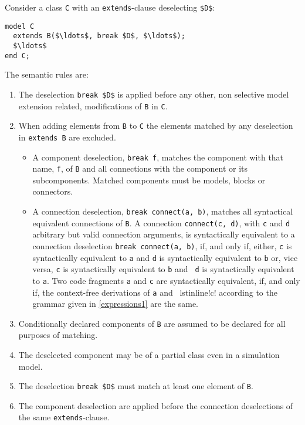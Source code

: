 Consider a class \lstinline!C! with an \lstinline!extends!-clause deselecting \lstinline!$D$!:
\begin{lstlisting}[language=modelica]
model C
  extends B($\ldots$, break $D$, $\ldots$);
  $\ldots$
end C;
\end{lstlisting}
The semantic rules are:
\begin{enumerate}
\item
  The deselection \lstinline!break $D$! is applied before any other, non selective model extension related, modifications of \lstinline!B! in \lstinline!C!.
\item
  When adding elements from \lstinline!B! to \lstinline!C! the elements matched by any deselection in \lstinline!extends B! are excluded.
  \begin{itemize}
  \item
    A component deselection, \lstinline!break f!, matches the component with that name, \lstinline!f!, of \lstinline!B! and all connections with the  component or its subcomponents.
    Matched components must be models, blocks or connectors.
  \item
    A connection deselection, \lstinline!break connect(a, b)!, matches all syntactical equivalent connections of \lstinline!B!.
    A connection \lstinline!connect(c, d)!, with \lstinline!c! and \lstinline!d! arbitrary but valid connection arguments, is syntactically equivalent  to a connection deselection \lstinline!break connect(a, b)!, if, and only if, either, \lstinline!c! is syntactically equivalent to \lstinline!a! and   \lstinline!d! is syntactically equivalent to \lstinline!b! or, vice versa, \lstinline!c! is syntactically equivalent to \lstinline!b! and \lstinline! d! is syntactically equivalent to \lstinline!a!.
    Two code fragments \lstinline!a! and \lstinline!c! are syntactically equivalent, if, and only if, the context-free derivations of \lstinline!a! and \ lstinline!c! according to the grammar given in \cref{expressions1} are the same.
  \end{itemize}
\item
  Conditionally declared components of \lstinline!B! are assumed to be declared for all purposes of matching.
\item
  The deselected component may be of a partial class even in a simulation model.
\item
  The deselection \lstinline!break $D$! must match at least one element of \lstinline!B!.
\item
  The component deselection are applied before the connection deselections of the same \lstinline!extends!-clause.
\end{enumerate}

